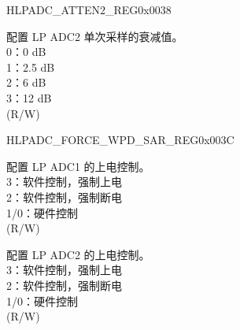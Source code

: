 \begin{register}{H}{LPADC\_ATTEN2\_REG}{0x0038}\label{regdesc:LPADCATTEN2REG}
%
\regnewline%
\begin{regdesc}\begin{reglist}
\label{fielddesc:LPADCSAR2ATTEN}\item [LPADC\_SAR2\_ATTEN] 配置 LP ADC2 单次采样的衰减值。\\
0：0 dB \\
1：2.5 dB \\
2：6 dB \\
3：12 dB \\
(R/W)
\end{reglist}\end{regdesc}
\end{register}


\begin{register}{H}{LPADC\_FORCE\_WPD\_SAR\_REG}{0x003C}\label{regdesc:LPADCFORCEWPDSARREG}
%
%
%
\regnewline%
\begin{regdesc}\begin{reglist}
\label{fielddesc:LPADCFORCEXPDSAR1}\item [LPADC\_FORCE\_XPD\_SAR1]
配置 LP ADC1 的上电控制。\\
3：软件控制，强制上电\\
2：软件控制，强制断电\\
1/0：硬件控制\\
(R/W)
\label{fielddesc:LPADCFORCEXPDSAR2}\item [LPADC\_FORCE\_XPD\_SAR2] 配置 LP ADC2 的上电控制。\\
3：软件控制，强制上电\\
2：软件控制，强制断电\\
1/0：硬件控制\\
(R/W)
\end{reglist}\end{regdesc}
\end{register}


